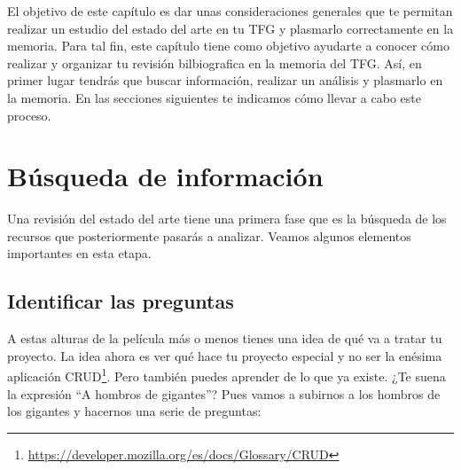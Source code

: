 El objetivo de este capítulo es dar unas consideraciones generales que te permitan realizar un estudio del estado del arte en tu TFG y plasmarlo correctamente en la memoria. Para tal fin, este capítulo tiene como objetivo ayudarte a conocer cómo realizar y organizar tu revisión bilbiografica en la memoria del TFG. Así, en primer lugar tendrás que buscar información, realizar un análisis y plasmarlo en la memoria. En las secciones siguientes te indicamos cómo llevar a cabo este proceso.

\section{Búsqueda de información}

Una revisión del estado del arte tiene una primera fase que es la búsqueda de los recursos que posteriormente pasarás a analizar. Veamos algunos elementos importantes en esta etapa.

\subsection{Identificar las preguntas}


A estas alturas de la película más o menos tienes una idea de qué va a tratar tu proyecto. La idea ahora es ver qué hace tu proyecto especial y no ser la enésima aplicación CRUD\footnote{\url{https://developer.mozilla.org/es/docs/Glossary/CRUD}}. Pero también puedes aprender de lo que ya existe. ¿Te suena la expresión ``A hombros de gigantes''? Pues vamos a subirnos a los hombros de los gigantes y hacernos una serie de preguntas:

